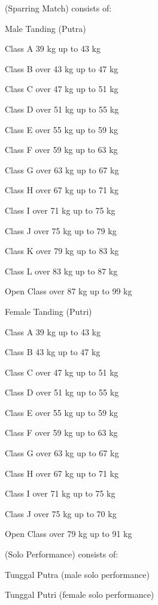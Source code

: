 \begin{legal}
\item {} (Sparring Match) consists of:
    \begin{legal}
    \item Male Tanding (Putra)
        \begin{legal}
        \item Class A 39 kg up to 43 kg
        \item Class B over 43 kg up to 47 kg 
        \item Class C over 47 kg up to 51 kg
        \item Class D over 51 kg up to 55 kg  
        \item Class E over 55 kg up to 59 kg  
        \item Class F over 59 kg up to 63 kg  
        \item Class G over 63 kg up to 67 kg  
        \item Class H over 67 kg up to 71 kg  
        \item Class I over 71 kg up to 75 kg  
        \item Class J over 75 kg up to 79 kg  
        \item Class K over 79 kg up to 83 kg 
        \item Class L over 83 kg up to 87 kg  
        \item Open Class over 87 kg up to 99 kg
        \end{legal}
    \item Female Tanding (Putri)
        \begin{legal}
        \item Class A 39 kg up to 43 kg
        \item Class B 43 kg up to 47 kg
        \item Class C over 47 kg up to 51 kg
        \item Class D over 51 kg up to 55 kg
        \item Class E over 55 kg up to 59 kg
        \item Class F over 59 kg up to 63 kg
        \item Class G over 63 kg up to 67 kg
        \item Class H over 67 kg up to 71 kg
        \item Class I over 71 kg up to 75 kg
        \item Class J over 75 kg up to 70 kg
        \item Open Class over 79 kg up to 91 kg
        \end{legal}
    \item {} (Solo Performance) consists of:
        \begin{legal}
        \item Tunggal Putra (male solo performance)
        \item Tunggal Putri (female solo performance)
        \end{legal}


\end{legal}
\end{legal}
